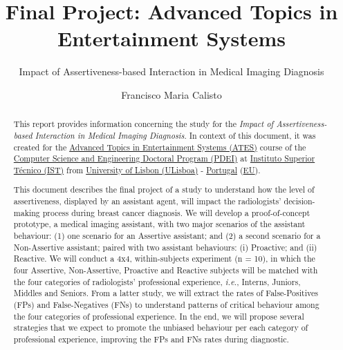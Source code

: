 \documentclass[sigchi]{acmart}
\begin{document}
\title[Final Project]{\normalsize Final Project: Advanced Topics in Entertainment Systems}
\subtitle{Impact of Assertiveness-based Interaction in Medical Imaging Diagnosis}

\author{Francisco Maria Calisto}

\renewcommand{\shortauthors}{Calisto}


\begin{abstract}

This report provides information concerning the study for the \textit{Impact of Assertiveness-based Interaction in Medical Imaging Diagnosis}.
In context of this document, it was created for the \hyperlink{https://fenix.tecnico.ulisboa.pt/disciplinas/TASE4/2019-2020/2-semestre}{Advanced Topics in Entertainment Systems (ATES)} course of the \hyperlink{https://fenix.tecnico.ulisboa.pt/cursos/deic/curriculo}{Computer Science and Engineering Doctoral Program (PDEI)} at \hyperlink{https://tecnico.ulisboa.pt/en/}{Instituto Superior T\'{e}cnico (IST)} from \hyperlink{https://www.ulisboa.pt/}{University of Lisbon (ULisboa)} - \hyperlink{https://www.portugal.gov.pt/en/}{Portugal} (\hyperlink{https://europa.eu}{EU}).

This document describes the final project of a study to understand how the level of assertiveness, displayed by an assistant agent, will impact the radiologists' decision-making process during breast cancer diagnosis.
We will develop a proof-of-concept prototype, a medical imaging assistant, with two major scenarios of the assistant behaviour:
(1) one scenario for an Assertive assistant; and
(2) a second scenario for a Non-Assertive assistant;
paired with two assistant behaviours:
(i) Proactive; and
(ii) Reactive.
We will conduct a 4x4, within-subjects experiment (n = 10), in which the four Assertive, Non-Assertive, Proactive and Reactive subjects will be matched with the four categories of radiologists' professional experience, {\it i.e.}, Interns, Juniors, Middles and Seniors.
From a latter study, we will extract the rates of False-Positives (FPs) and False-Negatives (FNs) to understand patterns of critical behaviour among the four categories of professional experience.
In the end, we will propose several strategies that we expect to promote the unbiased behaviour per each category of professional experience, improving the FPs and FNs rates during diagnostic.

\end{abstract}
\end{document}
